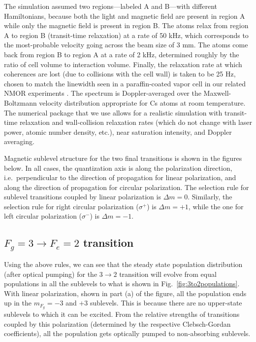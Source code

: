 The simulation assumed two regions---labeled A and B---with different Hamiltonians, because both the light and magnetic field are present in region A while only the magnetic field is present in region B. The atoms relax from region A to region B (transit-time relaxation) at a rate of 50 kHz, which corresponds to the most-probable velocity going across the beam size of 3 mm. The atoms come back from region B to region A at a rate of 2 kHz, determined roughly by the ratio of cell volume to interaction volume. Finally, the relaxation rate at which coherences are lost (due to collisions with the cell wall) is taken to be 25 Hz, chosen to match the linewidth seen in a paraffin-coated vapor cell in our related NMOR experiments \cite{RCN11}. The spectrum is Doppler-averaged over the Maxwell-Boltzmann velocity distribution appropriate for Cs atoms at room temperature. The numerical package that we use allows for a realistic simulation with transit-time relaxation and wall-collision relaxation rates (which do not change with laser power, atomic number density, etc.), near saturation intensity, and Doppler averaging. 

Magnetic sublevel structure for the two final transitions is shown in the figures below. In all cases, the quantization axis is along the polarization direction, i.e.\ perpendicular to the direction of propagation for linear polarization, and along the direction of propagation for circular polarization. The selection rule for sublevel transitions coupled by linear polarization is $ \Delta m = 0 $. Similarly, the selection rule for right circular polarization ($ \sigma^+ $) is $ \Delta m = +1 $, while the one for left circular polarization ($ \sigma^- $) is $ \Delta m = -1 $.

\subsection{$ F_g = 3 \rightarrow F_e = 2 $ \rm {transition}}
Using the above rules, we can see that the steady state population distribution (after optical pumping) for the $ 3 \rightarrow 2 $ transition will evolve from equal populations in all the sublevels to what is shown in Fig.\ \ref{fig:3to2populations}. With linear polarization, shown in part (a) of the figure, all the population ends up in the $ m_{F_g} = -3 $ and $ +3 $ sublevels. This is because there are no upper-state sublevels to which it can be excited. From the relative strengths of transitions coupled by this polarization (determined by the respective Clebsch-Gordan coefficients), all the population gets optically pumped to non-absorbing sublevels.

